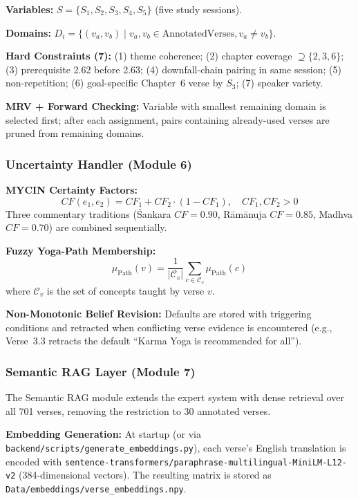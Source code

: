 \documentclass[conference]{IEEEtran}
\begin{document}
\textbf{Variables:} $S = \{S_1, S_2, S_3, S_4, S_5\}$ (five study sessions).

\textbf{Domains:} $D_i = \{(v_a, v_b) \mid v_a, v_b \in \text{AnnotatedVerses}, v_a \neq v_b\}$.

\textbf{Hard Constraints (7):} (1) theme coherence; (2) chapter coverage
$\supseteq \{2,3,6\}$; (3) prerequisite 2.62 before 2.63;
(4) downfall-chain pairing in same session; (5) non-repetition;
(6) goal-specific Chapter~6 verse by $S_3$; (7) speaker variety.

\textbf{MRV + Forward Checking:} Variable with smallest remaining domain
is selected first; after each assignment, pairs containing already-used
verses are pruned from remaining domains.

\subsubsection{Uncertainty Handler (Module 6)}

\textbf{MYCIN Certainty Factors:}
\begin{equation}
  CF(e_1, e_2) = CF_1 + CF_2 \cdot (1 - CF_1), \quad CF_1, CF_2 > 0
  \label{eq:mycin}
\end{equation}
Three commentary traditions (\'Sankara $CF = 0.90$, R\={a}m\={a}nuja
$CF = 0.85$, Madhva $CF = 0.70$) are combined sequentially.

\textbf{Fuzzy Yoga-Path Membership:}
\begin{equation}
  \mu_{\text{Path}}(v) = \frac{1}{|\mathcal{C}_v|}
  \sum_{c \in \mathcal{C}_v} \mu_{\text{Path}}(c)
  \label{eq:fuzzy}
\end{equation}
where $\mathcal{C}_v$ is the set of concepts taught by verse $v$.

\textbf{Non-Monotonic Belief Revision:} Defaults are stored with triggering
conditions and retracted when conflicting verse evidence is encountered
(e.g., Verse~3.3 retracts the default ``Karma Yoga is recommended for all'').

\subsubsection{Semantic RAG Layer (Module 7)}

The Semantic RAG module extends the expert system with dense retrieval
over all 701 verses, removing the restriction to 30 annotated verses.

\textbf{Embedding Generation:} At startup (or via \texttt{backend/scripts/generate\_embeddings.py}),
each verse's English translation is encoded with
\texttt{sentence-transformers/paraphrase-multilingual-MiniLM-L12-v2} (384-dimensional vectors).
The resulting matrix is stored as \texttt{Data/embeddings/verse\_embeddings.npy}.
\end{document}
